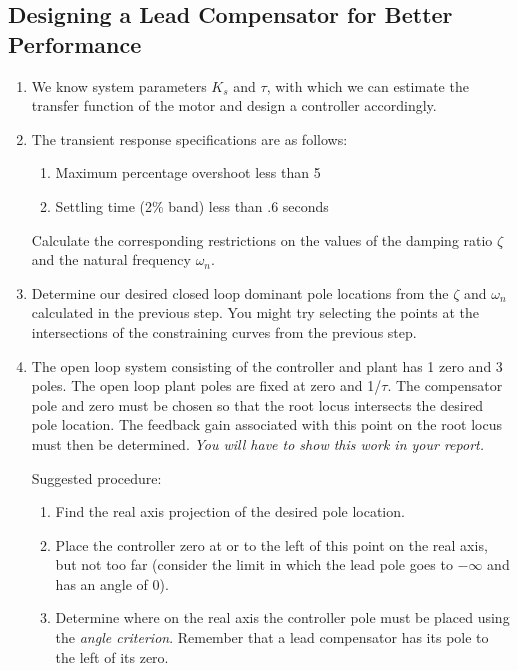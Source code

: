 \documentclass[11pt,a4paper]{article}
\begin{document}
\subsection{Designing a Lead Compensator for Better Performance}
\begin{enumerate}


\item We know system parameters $K_{s}$ and $\tau$, with which we can estimate the transfer function of the motor and design a controller accordingly.

\item The transient response specifications are as follows:
\begin{enumerate}
\item Maximum percentage overshoot less than 5%
\item Settling time (2\% band) less than .6 seconds
\end{enumerate}

Calculate the corresponding restrictions on the values of the damping ratio $\zeta$ and the natural frequency $\omega_{n}$.


\item Determine our desired closed loop dominant pole locations from the $\zeta$ and $\omega_{n}$ calculated in the previous step. You might try selecting the points at the intersections of the constraining curves from the previous step.

\item  The open loop system consisting of the controller and plant has 1 zero and 3 poles. The open loop plant poles are fixed at zero and 1/$\tau$. The compensator pole and zero must be chosen so that the root locus intersects the desired pole location. The feedback gain associated with this point on the root locus must then be determined. \textit{You will have to show this work in your report.}

Suggested procedure:
\begin{enumerate}

\item Find the real axis projection of the desired pole location.

\item \label{step:zeropos} Place the controller zero at or to the left of this point on the real axis, but not too far (consider the limit in which the lead pole goes to $-\infty$ and has an angle of 0).

\item Determine where on the real axis the controller pole must be placed using the \textit{angle criterion}. Remember that a lead compensator has its pole to the left of its zero.


\end{enumerate}
\end{enumerate}
\end{document}
